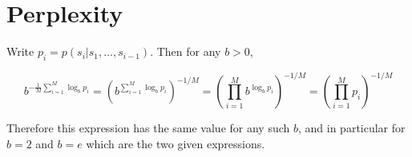 \documentclass{article}
\begin{document}
\section{Perplexity}

Write $p_i = p(s_i|s_1,\ldots,s_{i-1})$. Then for any $b > 0$,

$$b^{-\frac{1}{M}\sum_{i=1}^M \log_b p_i} = (b^{\sum_{i=1}^M \log_b p_i})^{-1/M} = (\prod_{i=1}^M b^{\log_b p_i})^{-1/M} = (\prod_{i=1}^M p_i)^{-1/M}$$

Therefore this expression has the same value for any such $b$, and in particular for $b=2$ and $b=e$ which are the two given expressions.
\end{document}
